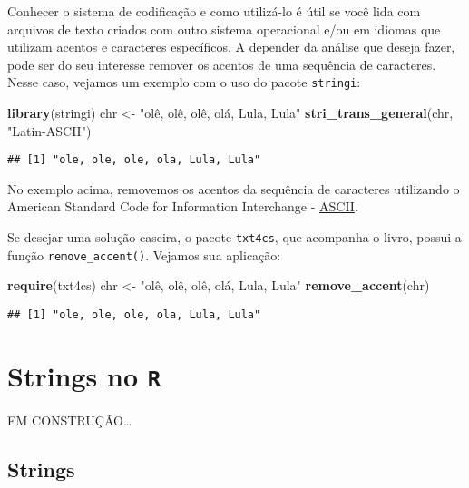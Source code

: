 \documentclass[]{book}
\newenvironment{Shaded}{\begin{snugshade}}{\end{snugshade}}
\newcommand{\KeywordTok}[1]{\textcolor[rgb]{0.13,0.29,0.53}{\textbf{#1}}}
\newcommand{\NormalTok}[1]{#1}
\newcommand{\StringTok}[1]{\textcolor[rgb]{0.31,0.60,0.02}{#1}}
\begin{document}
Conhecer o sistema de codificação e como utilizá-lo é útil se você lida com arquivos de texto criados com outro sistema operacional e/ou em idiomas que utilizam acentos e caracteres específicos. A depender da análise que deseja fazer, pode ser do seu interesse remover os acentos de uma sequência de caracteres. Nesse caso, vejamos um exemplo com o uso do pacote \texttt{stringi}:

\begin{Shaded}
\begin{Highlighting}[]
\KeywordTok{library}\NormalTok{(stringi)}
\NormalTok{chr <-}\StringTok{ "olê, olê, olê, olá, Lula, Lula"}
\KeywordTok{stri_trans_general}\NormalTok{(chr, }\StringTok{"Latin-ASCII"}\NormalTok{)}
\end{Highlighting}
\end{Shaded}

\begin{verbatim}
## [1] "ole, ole, ole, ola, Lula, Lula"
\end{verbatim}

No exemplo acima, removemos os acentos da sequência de caracteres utilizando o
American Standard Code for Information Interchange - \href{https://en.wikipedia.org/wiki/ASCII}{ASCII}.

Se desejar uma solução caseira, o pacote \texttt{txt4cs}, que acompanha o livro, possui a função \texttt{remove\_accent()}. Vejamos sua aplicação:

\begin{Shaded}
\begin{Highlighting}[]
\KeywordTok{require}\NormalTok{(txt4cs)}
\NormalTok{chr <-}\StringTok{ "olê, olê, olê, olá, Lula, Lula"}
\KeywordTok{remove_accent}\NormalTok{(chr)}
\end{Highlighting}
\end{Shaded}

\begin{verbatim}
## [1] "ole, ole, ole, ola, Lula, Lula"
\end{verbatim}

\hypertarget{stringR}{%
\chapter{\texorpdfstring{Strings no \texttt{R}}{Strings no R}}\label{stringR}}

EM CONSTRUÇÃO\ldots{}

\hypertarget{strings}{%
\section{Strings}\label{strings}}
\end{document}
